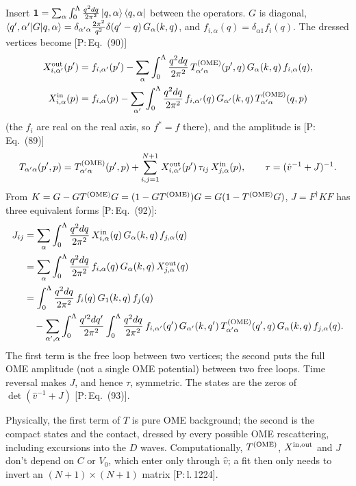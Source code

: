 \documentclass[11pt,a4paper]{article}
\newcommand{\tagP}[1]{\textcolor{blue!65!black}{\textsf{\small[P:\,#1]}}}
\renewcommand{\TOME}{T^{\rm (OME)}}
\newenvironment{aiadd}{\par}{\par}
\begin{document}
\begin{aiadd}
	Insert $\bm 1=\sum_\alpha\int_0^\Lambda\frac{q^2dq}{2\pi^2}\ket{q,\alpha}\bra{q,\alpha}$ between the operators. $G$ is diagonal, $\braket{q',\alpha'|G|q,\alpha}=\delta_{\alpha'\alpha}\frac{2\pi^2}{q^2}\delta(q'-q)\,G_\alpha(k,q)$, and $f_{i,\alpha}(q)=\delta_{\alpha1}f_i(q)$. The dressed vertices become \tagP{Eq.~(90)}
	\begin{align*}
		X^{\rm out}_{i,\alpha'}(p') & =f_{i,\alpha'}(p')-\sum_\alpha\int_0^\Lambda\frac{q^2dq}{2\pi^2}\,\TOME_{\alpha'\alpha}(p',q)\,G_\alpha(k,q)\,f_{i,\alpha}(q),    \\
		X^{\rm in}_{i,\alpha}(p)    & =f_{i,\alpha}(p)-\sum_{\alpha'}\int_0^\Lambda\frac{q^2dq}{2\pi^2}\,f_{i,\alpha'}(q)\,G_{\alpha'}(k,q)\,\TOME_{\alpha'\alpha}(q,p)
	\end{align*}
	(the $f_i$ are real on the real axis, so $f^*=f$ there), and the amplitude is \tagP{Eq.~(89)}
	\[
		T_{\alpha'\alpha}(p',p)=\TOME_{\alpha'\alpha}(p',p)+\sum_{i,j=1}^{N+1}X^{\rm out}_{i,\alpha'}(p')\,\tau_{ij}\,X^{\rm in}_{j,\alpha}(p),\qquad\tau=(\hat v^{-1}+J)^{-1}.
	\]
	From $K=G-G\TOME G=(1-G\TOME)G=G(1-\TOME G)$, $J=F^\dagger KF$ has three equivalent forms \tagP{Eq.~(92)}:
	\begin{align*}
		J_{ij} & =\sum_\alpha\int_0^\Lambda\frac{q^2dq}{2\pi^2}\,X^{\rm in}_{i,\alpha}(q)\,G_\alpha(k,q)\,f_{j,\alpha}(q)                                                                                              \\
		       & =\sum_\alpha\int_0^\Lambda\frac{q^2dq}{2\pi^2}\,f_{i,\alpha}(q)\,G_\alpha(k,q)\,X^{\rm out}_{j,\alpha}(q)                                                                                             \\
		       & =\int_0^\Lambda\frac{q^2dq}{2\pi^2}\,f_i(q)\,G_1(k,q)\,f_j(q)                                                                                                                                         \\
		       & \quad-\sum_{\alpha',\alpha}\int_0^\Lambda\frac{q'^2dq'}{2\pi^2}\int_0^\Lambda\frac{q^2dq}{2\pi^2}\,f_{i,\alpha'}(q')\,G_{\alpha'}(k,q')\,\TOME_{\alpha'\alpha}(q',q)\,G_\alpha(k,q)\,f_{j,\alpha}(q).
	\end{align*}
	The first term is the free loop between two vertices; the second puts the full OME amplitude (not a single OME potential) between two free loops. Time reversal makes $J$, and hence $\tau$, symmetric. The states are the zeros of $\det(\hat v^{-1}+J)$ \tagP{Eq.~(93)}.

	Physically, the first term of $T$ is pure OME background; the second is the compact states and the contact, dressed by every possible OME rescattering, including excursions into the $D$ waves. Computationally, $\TOME$, $X^{\rm in,out}$ and $J$ don't depend on $C$ or $V_0$, which enter only through $\hat v$; a fit then only needs to invert an $(N+1)\times(N+1)$ matrix \tagP{l.\,1224}.
\end{aiadd}
\end{document}
